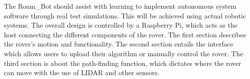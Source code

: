 
The Roam\_Bot should assist with learning to implement autonomous system software through real test simulations. This will be achieved using actual robotic systems. The overall design is controlled by a Raspberry Pi, which acts as the host connecting the different components of the rover. The first section describes the rover's motion and functionality. The second section entails the interface which allows users to upload their algorithm or manually control the rover. The third section is about the path-finding function, which dictates where the rover can move with the use of LIDAR and other sensors.
